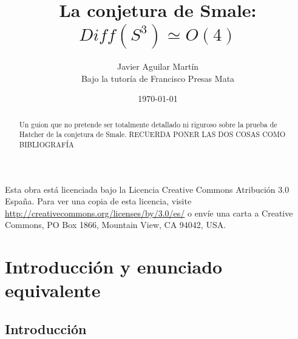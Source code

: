 \documentclass[twoside, 11pt]{article}
\begin{document}

\author{Javier Aguilar Martín\\ Bajo la tutoría de Francisco Presas Mata}

\date{\today}
\title{La conjetura de Smale:\\ $Diff(S^3)\simeq O(4)$}

\maketitle


\begin{abstract}
Un guion que no pretende ser totalmente detallado ni riguroso sobre la prueba de Hatcher de la conjetura de Smale. RECUERDA PONER LAS DOS COSAS COMO BIBLIOGRAFÍA
\end{abstract}


	\vfill
	Esta obra está licenciada bajo la Licencia Creative Commons Atribución 3.0 España. Para ver una copia de esta licencia, visite \url{http://creativecommons.org/licenses/by/3.0/es/} o envíe una carta a Creative Commons, PO Box 1866, Mountain View, CA 94042, USA.


\newpage
\tableofcontents

\newpage

\section{Introducción y enunciado equivalente}
\subsection{Introducción}
\end{document}
